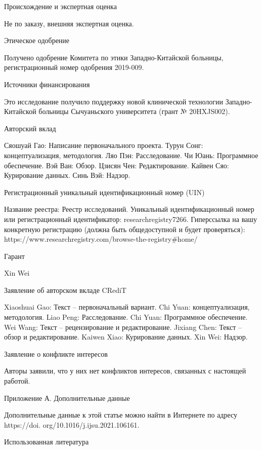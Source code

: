 Происхождение и экспертная оценка

Не по заказу, внешняя экспертная оценка.

Этическое одобрение

Получено одобрение Комитета по этики Западно-Китайской больницы, регистрационный номер одобрения 2019-009.

Источники финансирования

Это исследование получило поддержку новой клинической технологии Западно-Китайской больницы Сычуаньского университета (грант № 20HXJS002).

Авторский вклад

Сяошуай Гао: Написание первоначального проекта. Турун Сонг: концептуализация, методология. Ляо Пэн: Расследование. Чи Юань: Программное обеспечение. Вэй Ван: Обзор. Цзисян Чен: Редактирование. Кайвен Сяо: Курирование данных. Синь Вэй: Надзор.

Регистрационный уникальный идентификационный номер (UIN)

Название реестра: Реестр исследований.
Уникальный идентификационный номер или регистрационный идентификатор: researchregistry7266.
Гиперссылка на вашу конкретную регистрацию (должна быть общедоступной и будет проверяться): https://www.researchregistry.com/browse-the-registry#home/

Гарант

Xin Wei

Заявление об авторском вкладе CRediT

Xiaoshuai Gao: Текст – первоначальный вариант. Chi Yuan: концептуализация, методология. Liao Peng: Расследование. Chi Yuan: Программное обеспечение. Wei Wang: Текст – рецензирование и редактирование. Jixiang Chen: Текст – обзор и редактирование. Kaiwen Xiao: Курирование данных. Xin Wei: Надзор.

Заявление о конфликте интересов

Авторы заявили, что у них нет конфликтов интересов, связанных с настоящей работой.

Приложение А. Дополнительные данные

Дополнительные данные к этой статье можно найти в Интернете по адресу https://doi. org/10.1016/j.ijsu.2021.106161.

Использованная литература

